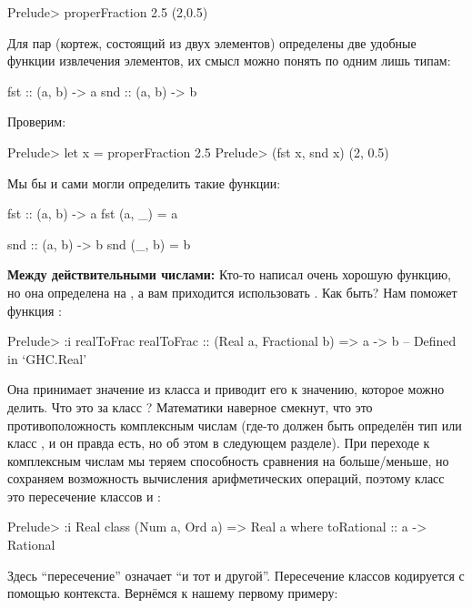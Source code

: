 \begin{code}
Prelude> properFraction 2.5
(2,0.5)
\end{code}

 Для пар (кортеж, состоящий из двух элементов) определены
две удобные функции извлечения элементов, их смысл можно понять по одним
лишь типам:


\begin{code}
fst :: (a, b) -> a
snd :: (a, b) -> b
\end{code}

Проверим:


\begin{code}
Prelude> let x = properFraction 2.5
Prelude> (fst x, snd x)
(2, 0.5)
\end{code}

Мы бы и сами могли определить такие функции:


\begin{code}
fst :: (a, b) -> a
fst (a, _) = a 

snd :: (a, b) -> b
snd (_, b) = b
\end{code}

\textbf{Между действительными числами:} Кто-то написал очень хорошую
функцию, но она определена на , а вам приходится использовать
. Как быть? Нам поможет функция :


\begin{code}
Prelude> :i realToFrac
realToFrac :: (Real a, Fractional b) => a -> b
  	-- Defined in `GHC.Real'
\end{code}

Она принимает значение из класса  и приводит его к значению,
которое можно делить. Что это за класс ? Математики наверное
смекнут, что это противоположность комплексным числам (где-то должен
быть определён тип или класс , и он правда есть, но об этом
в следующем разделе). При переходе к комплексным числам мы теряем
способность сравнения на больше/меньше, но сохраняем возможность
вычисления арифметических операций, поэтому класс  это
пересечение классов  и :


\begin{code}
Prelude> :i Real
class (Num a, Ord a) => Real a where
  toRational :: a -> Rational
\end{code}

Здесь ``пересечение'' означает ``и тот и другой''. Пересечение классов
кодируется с помощью контекста. Вернёмся к нашему первому примеру:


